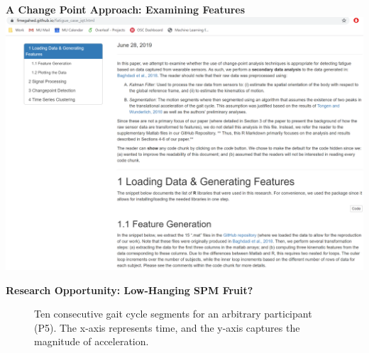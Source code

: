 \documentclass[aspectratio=43]{beamer}
\begin{document}
\begin{frame}{\textbf{A Change Point Approach: Examining Features}}
    \centering
    \href{https://fmegahed.github.io/fatigue_case_jqt.html}{
    \includegraphics[width=\textwidth, height=0.8\textheight,keepaspectratio, frame]{Figures/GitHub.PNG}}
\end{frame}

\begin{frame}{\textbf{Research Opportunity: Low-Hanging SPM Fruit?}}
    \begin{figure}
    \begin{center}
    \end{center}
    
    \caption{Ten consecutive gait cycle segments for an arbitrary participant (P5). The x-axis represents time, and the y-axis captures the magnitude of acceleration.}
    \label{fig:strides}
\end{figure}
\end{frame}
\end{document}
